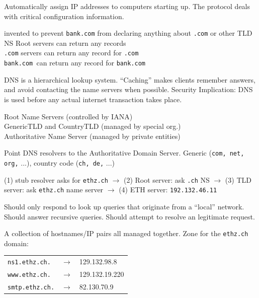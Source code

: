  Automatically assign IP addresses to computers starting up. The protocol deals with critical configuration information.

invented to prevent {\tt bank.com} from declaring anything about {\tt .com} or other TLD NS
Root servers can return any records\\
{\tt .com} servers can return any record for {\tt .com} \\
{\tt bank.com }can return any record for {\tt bank.com}

 DNS is a hierarchical lookup system. ``Caching'' makes clients remember answers, and avoid contacting the name servers when possible. Security Implication: DNS is used before any actual internet transaction takes place.

Root Name Servers (controlled by IANA) \\
GenericTLD and CountryTLD (managed by special org.) \\
Authoritative Name Server (managed by private entities)

 Point DNS resolvers to the Authoritative Domain Server. Generic ({\tt com, net, org,} ...), country code ({\tt ch, de,} ...)

(1) stub resolver asks for {\tt ethz.ch} $\to$ (2) Root server: ask {\tt .ch} NS $\to$ (3) TLD server: ask {\tt ethz.ch} name server $\to$ (4) ETH server: {\tt 192.132.46.11}

 Should only respond to look up queries that originate from a ``local'' network. Should answer recursive queries. Should attempt to resolve an legitimate request.

 A collection of hostnames/IP pairs all managed together. Zone for the {\tt ethz.ch} domain:

\begin{tabular}{lcl}
{\tt ns1.ethz.ch.} & $\to$ & 129.132.98.8 \\
{\tt www.ethz.ch.} & $\to$ & 129.132.19.220 \\
{\tt smtp.ethz.ch.} & $\to$ & 82.130.70.9 \\
\end{tabular}


